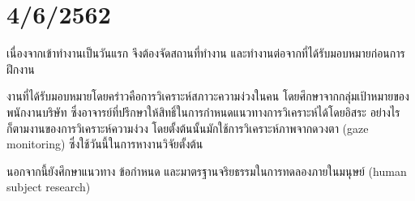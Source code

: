 \section*{4/6/2562}

เนื่องจากเข้าทำงานเป็นวันแรก จึงต้องจัดสถานที่ทำงาน และทำงานต่อจากที่ได้รับมอบหมายก่อนการฝึกงาน

งานที่ได้รับมอบหมายโดยคร่าวคือการวิเคราะห์สภาวะความง่วงในคน โดยศึกษาจากกลุ่มเป้าหมายของพนักงานบริษัท
ซึ่งอาจารย์ที่ปรึกษาให้สิทธิ์ในการกำหนดแนวทางการวิเคราะห์ได้โดยอิสระ อย่างไรก็ตามงานของการวิเคราะห์ความง่วง
โดยตั้งต้นนั้นมักใช้การวิเคราะห์ภาพจากดวงตา (gaze monitoring) ซึ่งใช้วันนี้ในการหางานวิจัยตั้งต้น

นอกจากนี้ยังศึกษาแนวทาง ข้อกำหนด และมาตรฐานจริยธรรมในการทดลองภายในมนุษย์ (human subject research)